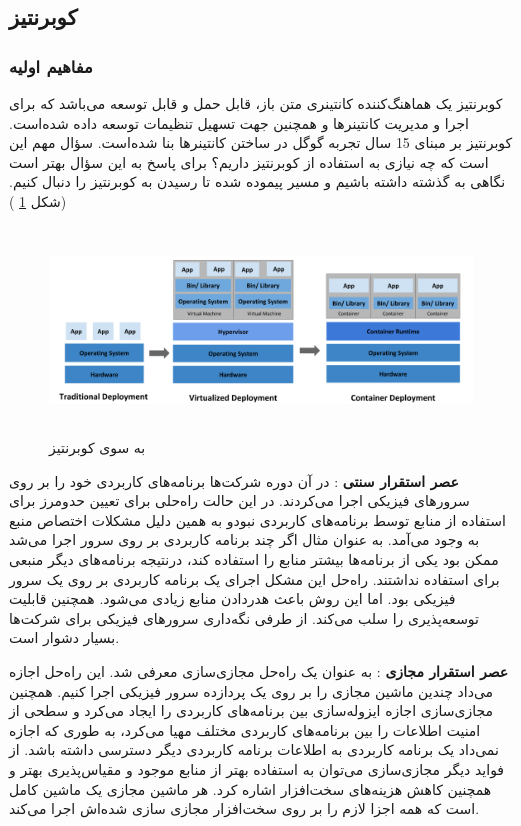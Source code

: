 \subsection{کوبرنتیز}

\subsubsection{مفاهیم اولیه}

کوبرنتیز یک هماهنگ‌کننده کانتینری متن باز، قابل حمل و قابل توسعه می‌باشد که برای اجرا و مدیریت کانتینرها و همچنین جهت تسهیل تنظیمات توسعه داده شده‌است. کوبرنتیز بر مبنای 15 سال تجربه گوگل در ساختن کانتینرها بنا شده‌است.
سؤال مهم این است که چه نیازی به استفاده از کوبرنتیز داریم؟ برای پاسخ به این سؤال بهتر است نگاهی به گذشته داشته باشیم و مسیر پیموده شده تا رسیدن به کوبرنتیز را دنبال کنیم.(شکل
\ref{تصویر 2-8}
)


\begin{figure}[!h]
	\centering
	\includegraphics[height=5.5cm]{fig2-8}
	\caption{به سوی کوبرنتیز}
	\label{تصویر 2-8}
\end{figure}

\textbf{عصر استقرار سنتی}
: در آن دوره شرکت‌ها برنامه‌های کاربردی خود را بر روی سرورهای فیزیکی اجرا می‌کردند. در این حالت راه‌حلی برای تعیین حد‌و‌مرز برای استفاده از منابع توسط برنامه‌های کاربردی نبودو به همین دلیل مشکلات اختصاص منبع به وجود می‌آمد. به عنوان مثال اگر چند برنامه کاربردی بر روی سرور اجرا می‌شد ممکن بود یکی از برنامه‌ها بیشتر منابع را استفاده کند، درنتیجه برنامه‌های دیگر منبعی برای استفاده نداشتند. راه‌حل این مشکل اجرای یک برنامه کاربردی بر روی یک سرور فیزیکی بود. اما این روش باعث هدر‌دادن منابع زیادی می‌شود. همچنین قابلیت توسعه‌پذیری را سلب می‌کند. از طرفی نگه‌داری سرورهای فیزیکی برای شرکت‌ها بسیار دشوار است.  

\textbf{عصر استقرار مجازی}
: به عنوان یک راه‌حل مجازی‌سازی معرفی شد. این راه‌حل اجازه می‌داد چندین ماشین مجازی را بر روی یک پردازده سرور فیزیکی اجرا کنیم. همچنین مجازی‌سازی اجازه ایزوله‌سازی بین برنامه‌های کاربردی را ایجاد می‌کرد و سطحی از امنیت اطلاعات را بین برنامه‌های کاربردی مختلف مهیا می‌کرد، به طوری که اجازه نمی‌داد یک برنامه کاربردی به اطلاعات برنامه کاربردی دیگر دسترسی داشته باشد. از فواید دیگر مجازی‌سازی می‌توان به استفاده بهتر از منابع موجود و مقیاس‌پذیری بهتر و همچنین کاهش هزینه‌های سخت‌افزار اشاره کرد. هر ماشین مجازی یک ماشین کامل است که همه اجزا لازم  را بر روی سخت‌افزار مجازی سازی‌ شده‌اش اجرا می‌کند.


